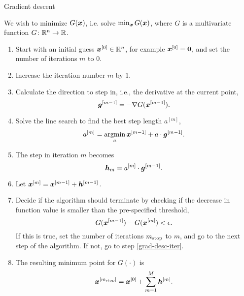 \begin{algorithm}
\caption{Gradient descent}
\label{algo:grad-desc}
We wish to minimize $G(\bm{x})$, i.e. solve $\min_{\bm{x}}G(\bm{x})$, where $G$ is a multivariate function $G\colon\mathbb{R}^n\to\mathbb{R}$.
\begin{enumerate}
    \item
        Start with an initial guess $\bm{x}^{[0]}\in\mathbb{R}^n$, for example $\bm{x}^{[0]}=\bm{0}$, and set the number of iterations $m$ to 0.
    \item
        \label{grad-desc-iter}
        Increase the iteration number $m$ by 1.
    \item
        Calculate the direction to step in, i.e., the derivative at the current point,
        \begin{equation*}
            \bm{g}^{[m-1]}=-\nabla G(\bm{x}^{[m-1]}).
        \end{equation*}
    \item
        Solve the line search to find the best step length $a^{[m]}$,
        \begin{equation*}
            a^{[m]}=\operatorname*{argmin}_{a}\bm{x}^{[m-1]}+a\cdot\bm{g}^{[m-1]}.
        \end{equation*}
    \item
        The step in iteration $m$ becomes
        \begin{equation*}
            \bm{h}_m=a^{[m]}\cdot\bm{g}^{[m-1]}.
        \end{equation*}
    \item
        Let $\bm{x}^{[m]}=\bm{x}^{[m-1]}+\bm{h}^{[m-1]}$.
    \item
        Decide if the algorithm should terminate by checking if the decrease in function value is smaller than the pre-specified threshold,
        \begin{equation*}
            G(\bm{x}^{[m-1]})-G(\bm{x}^{[m]})<\epsilon.
        \end{equation*}
        If this is true, set the number of iterations $m_{\text{stop}}$ to $m$, and go to the next step of the algorithm.
        If not, go to step \ref{grad-desc-iter}.
    \item
        The resulting minimum point for $G(\cdot)$ is
        \begin{equation*}
            \bm{x}^{[m_{\text{stop}}]}=\bm{x}^{[0]}+\sum_{m=1}^M\bm{h}^{[m]}.
        \end{equation*}
\end{enumerate}
\end{algorithm}

